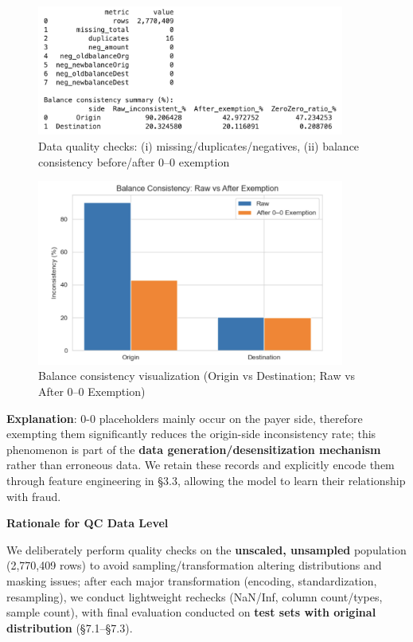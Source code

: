 \documentclass[sigplan,screen]{acmart}
\begin{document}
\begin{figure}[h!]
    \centering
    \includegraphics[width=0.9\textwidth]{3.2b.png}
    \caption{Data quality checks: (i) missing/duplicates/negatives, (ii) balance consistency before/after 0--0 exemption}
    \label{fig:quality_check}
\end{figure}

\begin{figure}[h!]
    \centering
    \includegraphics[width=0.9\textwidth]{3.2c.png}
    \caption{Balance consistency visualization (Origin vs Destination; Raw vs After 0--0 Exemption)}
    \label{fig:balance_consistency}
\end{figure}

\textbf{Explanation}: 0-0 placeholders mainly occur on the payer side, therefore exempting them significantly reduces the origin-side inconsistency rate; this phenomenon is part of the \textbf{data generation/desensitization mechanism} rather than erroneous data. We retain these records and explicitly encode them through feature engineering in \S3.3, allowing the model to learn their relationship with fraud.

\textbf{Rationale for QC Data Level}

We deliberately perform quality checks on the \textbf{unscaled, unsampled} population (2,770,409 rows) to avoid sampling/transformation altering distributions and masking issues; after each major transformation (encoding, standardization, resampling), we conduct lightweight rechecks (NaN/Inf, column count/types, sample count), with final evaluation conducted on \textbf{test sets with original distribution} (\S7.1--\S7.3).
\end{document}
